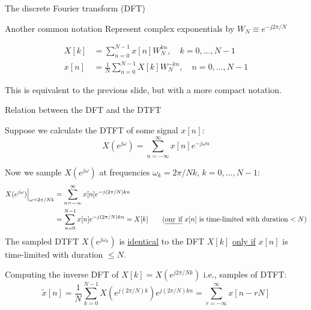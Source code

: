 \documentclass[10pt]{beamer}
\begin{document}
%
\begin{frame}{The discrete Fourier transform (DFT)}
\begin{block}{Another common notation}
	Represent complex exponentials by $W_N \equiv e^{-j2\pi/N}$
	
	\begin{align}
	X[k] &= \sum_{n = 0}^{N-1}x[n]W_N^{kn}, \quad k = 0, \ldots, N-1 \tag{direct transform} \\
	x[n] &= \frac{1}{N}\sum_{n = 0}^{N-1}X[k]W_N^{-kn}, \quad n = 0, \ldots, N-1 \tag{inverse transform}
	\end{align}
\end{block}	
This is equivalent to the previous slide, but with a more compact notation.
\end{frame}

%
\begin{frame}{Relation between the DFT and the DTFT}

Suppose we calculate the DTFT of some signal $x[n]$:
\begin{equation*}
X(e^{j\omega}) = \sum_{n=-\infty}^{\infty} x[n]e^{-j\omega n} \tag{DTFT of $x[n]$}
\end{equation*}

\pause
Now we sample $X(e^{j\omega})$ at frequencies $\omega_k = 2\pi/Nk$, $k = 0, \ldots, N-1$:
\begin{align*}
	X(e^{j\omega})\Big|_{\omega = 2\pi/Nk} &= \sum_{n=-\infty}^{\infty}x[n]e^{-j(2\pi/N)kn} \\
	&= \sum_{n=0}^{N-1}x[n]e^{-j(2\pi/N)kn}= X[k] \tag{\underline{ony if} $x[n]$ is time-limited with duration $< N$}
\end{align*}
The sampled DTFT $X(e^{j\omega_k})$ is \underline{identical} to the DFT $X[k]$ \underline{only if} $x[n]$ is time-limited with duration $\leq N$.

\pause
Computing the inverse DFT of $X[k] = X(e^{j2\pi/Nk})$ i.e., samples of DTFT:
\begin{equation} \label{eq:replicated_xn}
	\tilde{x}[n] = \frac{1}{N}\sum_{k=0}^{N-1}X(e^{j(2\pi/N)k})e^{j(2\pi/N)kn} = \sum_{r=-\infty}^{\infty} x[n-rN]
\end{equation}
\end{frame}
\end{document}
